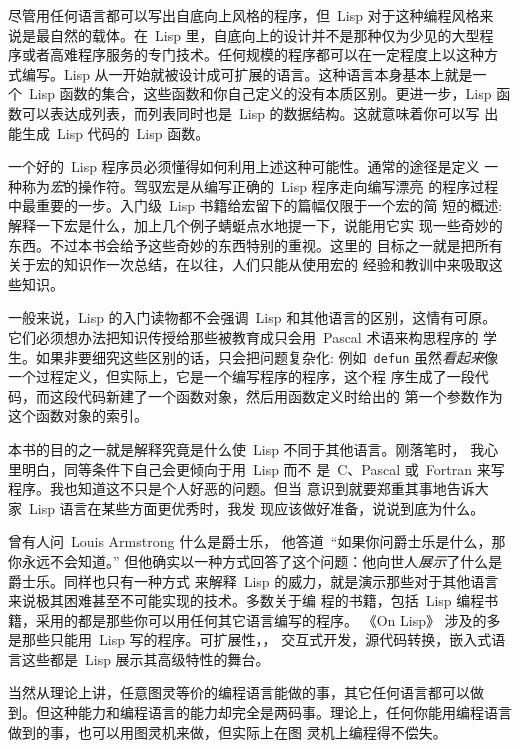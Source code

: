 尽管用任何语言都可以写出自底向上风格的程序，但~Lisp 对于这种编程风格来
说是最自然的载体。在~Lisp 里，自底向上的设计并不是那种仅为少见的大型程
序或者高难程序服务的专门技术。任何规模的程序都可以在一定程度上以这种方
式编写。Lisp 从一开始就被设计成可扩展的语言。这种语言本身基本上就是一
个~Lisp 函数的集合，这些函数和你自己定义的没有本质区别。更进一步，Lisp
函数可以表达成列表，而列表同时也是~Lisp 的数据结构。这就意味着你可以写
出能生成~Lisp 代码的~Lisp 函数。

一个好的~Lisp 程序员必须懂得如何利用上述这种可能性。通常的途径是定义
一种称为\emph{宏}的操作符。驾驭宏是从编写正确的~Lisp 程序走向编写漂亮
的程序过程中最重要的一步。入门级~Lisp 书籍给宏留下的篇幅仅限于一个宏的简
短的概述: 解释一下宏是什么，加上几个例子蜻蜓点水地提一下，说能用它实
现一些奇妙的东西。不过本书会给予这些奇妙的东西特别的重视。这里的
目标之一就是把所有关于宏的知识作一次总结，在以往，人们只能从使用宏的
经验和教训中来吸取这些知识。

一般来说，Lisp 的入门读物都不会强调~Lisp 和其他语言的区别，这情有可原。
它们必须想办法把知识传授给那些被教育成只会用~Pascal 术语来构思程序的
学生。如果非要细究这些区别的话，只会把问题复杂化: 例如~\texttt{defun}
虽然\emph{看起来}像一个过程定义，但实际上，它是一个编写程序的程序，这个程
序生成了一段代码，而这段代码新建了一个函数对象，然后用函数定义时给出的
第一个参数作为这个函数对象的索引。

本书的目的之一就是解释究竟是什么使~Lisp 不同于其他语言。刚落笔时，
我心里明白，同等条件下自己会更倾向于用~Lisp 而不
是~C、Pascal 或~Fortran 来写程序。我也知道这不只是个人好恶的问题。但当
意识到就要郑重其事地告诉大家~Lisp 语言在某些方面更优秀时，我发
现应该做好准备，说说到底为什么。

曾有人问~Louis Armstrong 什么是爵士乐，
他答道~``如果你问爵士乐是什么，那你永远不会知道。''
但他确实以一种方式回答了这个问题：他向世人\emph{展示}了什么是爵士乐。同样也只有一种方式
来解释~Lisp 的威力，就是演示那些对于其他语言来说极其困难甚至不可能实现的技术。多数关于编
程的书籍，包括~Lisp 编程书籍，采用的都是那些你可以用任何其它语言编写的程序。
《On Lisp》 涉及的多是那些只能用~Lisp 写的程序。可扩展性，\bup，
交互式开发，源代码转换，嵌入式语言\pozhehao{}这些都是~Lisp 展示其高级特性的舞台。

当然从理论上讲，任意图灵等价的编程语言能做的事，其它任何语言都可以做
到。但这种能力和编程语言的能力却完全是两码事。理论上，任何你能用编程语言
做到的事，也可以用图灵机来做，但实际上在图
灵机上编程得不偿失。

